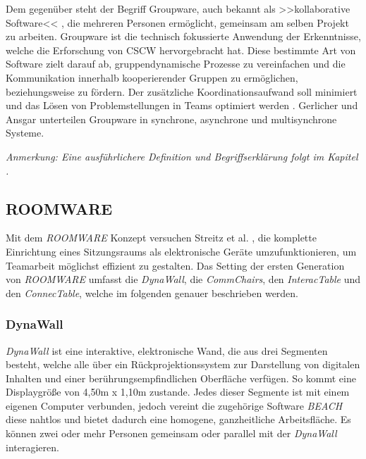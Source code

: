 Dem gegenüber steht der Begriff Groupware, auch bekannt als >>kollaborative Software<< \citep{Bannon:1990p244}, die mehreren Personen ermöglicht, gemeinsam am selben Projekt zu arbeiten. Groupware ist die technisch fokussierte Anwendung der Erkenntnisse, welche die Erforschung von CSCW hervorgebracht hat. Diese bestimmte Art von Software zielt darauf ab, gruppendynamische Prozesse zu vereinfachen und die Kommunikation innerhalb kooperierender Gruppen zu ermöglichen, beziehungsweise zu fördern. Der zusätzliche Koordinationsaufwand soll minimiert und das Lösen von Problemstellungen in Teams optimiert werden \citep{Rama:2006p245}. Gerlicher und Ansgar \citep{Gerlicher:2007p241} unterteilen Groupware in synchrone, asynchrone und multisynchrone Systeme.

\bigskip \emph{Anmerkung: \graffito{\(\clubsuit\)} Eine ausführlichere Definition und Begriffserklärung folgt im Kapitel .}

\subsection{ROOMWARE}

Mit dem \emph{ROOMWARE} Konzept versuchen Streitz et al. \citep{Streitz:2001p213, Streitz:2002p214, Tandler:2002p219}, die komplette Einrichtung eines Sitzungsraums als elektronische Geräte umzufunktionieren, um Teamarbeit möglichst effizient zu gestalten. Das Setting der ersten Generation von \emph{ROOMWARE} \citep{Streitz:2001p213} umfasst die \emph{DynaWall}, die \emph{CommChairs}, den \emph{InteracTable} und den \emph{ConnecTable}, welche im folgenden genauer beschrieben werden.

\subsubsection{DynaWall}

\emph{DynaWall} ist eine interaktive, elektronische Wand, die aus drei Segmenten besteht, welche alle über ein Rückprojektionssystem zur Darstellung von digitalen Inhalten und einer berührungsempfindlichen Oberfläche verfügen. So kommt eine Displaygröße von 4,50m x 1,10m zustande. Jedes dieser Segmente ist mit einem eigenen Computer verbunden, jedoch vereint die zugehörige Software \emph{BEACH} \citep{Tandler:2000p238} diese nahtlos und bietet dadurch eine homogene, ganzheitliche Arbeitsfläche. Es können zwei oder mehr Personen gemeinsam oder parallel mit der \emph{DynaWall} interagieren. 

